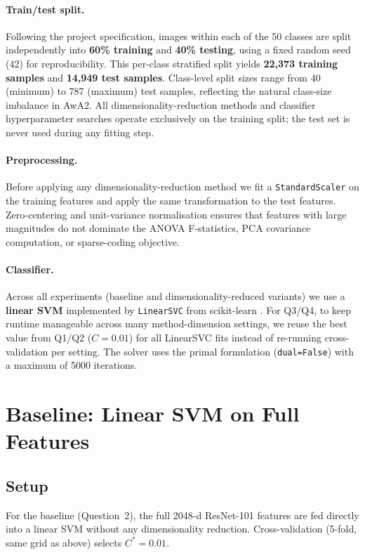 \documentclass[10pt,letterpaper]{article}
\begin{document}
\paragraph{Train/test split.}
Following the project specification, images within each of the 50 classes
are split independently into \textbf{60\% training} and
\textbf{40\% testing}, using a fixed random seed (42) for reproducibility.
This per-class stratified split yields \textbf{22,373 training samples} and
\textbf{14,949 test samples}.
Class-level split sizes range from 40 (minimum) to 787 (maximum) test
samples, reflecting the natural class-size imbalance in AwA2.
All dimensionality-reduction methods and classifier hyperparameter searches
operate exclusively on the training split; the test set is never used during
any fitting step.

\paragraph{Preprocessing.}
Before applying any dimensionality-reduction method we fit a
\texttt{StandardScaler} on the training features and apply the same
transformation to the test features.
Zero-centering and unit-variance normalisation ensures that features with
large magnitudes do not dominate the ANOVA F-statistics, PCA covariance
computation, or sparse-coding objective.

\paragraph{Classifier.}
Across all experiments (baseline and dimensionality-reduced variants) we
use a \textbf{linear SVM} implemented by \texttt{LinearSVC}
\cite{fan2008liblinear,cortes1995support} from scikit-learn
\cite{scikit-learn}.
For Q3/Q4, to keep runtime manageable across many method-dimension settings,
we reuse the best value from Q1/Q2 ($C=0.01$) for all LinearSVC fits instead
of re-running cross-validation per setting.
The solver uses the primal formulation (\texttt{dual=False}) with a
maximum of 5000 iterations.

\section{Baseline: Linear SVM on Full Features}
\label{sec:baseline}

\subsection{Setup}
For the baseline (Question~2), the full 2048-d ResNet-101 features are fed
directly into a linear SVM without any dimensionality reduction.
Cross-validation (5-fold, same grid as above) selects $C^* = 0.01$.
\end{document}
